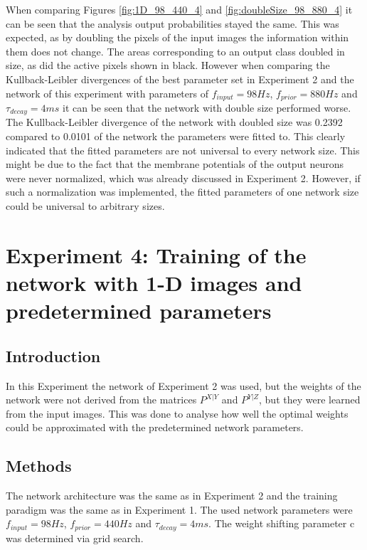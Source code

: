 When comparing Figures \ref{fig:1D_98_440_4} and \ref{fig:doubleSize_98_880_4} it can be seen that the analysis output probabilities stayed the same. This was expected, as by doubling the pixels of the input images the information within them does not change. The areas corresponding to an output class doubled in size, as did the active pixels shown in black. However when comparing the Kullback-Leibler divergences of the best parameter set in Experiment 2 and the network of this experiment with parameters of $f_{input} = 98 Hz$, $f_{prior} = 880 Hz$ and $\tau_{decay} = 4 ms$ it can be seen that the network with double size performed worse. The Kullback-Leibler divergence of the network with doubled size was 0.2392 compared to 0.0101 of the network the parameters were fitted to. This clearly indicated that the fitted parameters are not universal to every network size. This might be due to the fact that the membrane potentials of the output neurons were never normalized, which was already discussed in Experiment 2. However, if such a normalization was implemented, the fitted parameters of one network size could be universal to arbitrary sizes.

\section{Experiment 4: Training of the network with 1-D images and predetermined parameters}
\label{section:1DPreDetermined}

\subsection{Introduction}

In this Experiment the network of Experiment 2 was used, but the weights of the network were not derived from the matrices $P^{X|Y}$ and $P^{Y|Z}$, but they were learned from the input images. This was done to analyse how well the optimal weights could be approximated with the predetermined network parameters.

\subsection{Methods}

The network architecture was the same as in Experiment 2 and the training paradigm was the same as in Experiment 1. The used network parameters were $f_{input} = 98 Hz$, $f_{prior} = 440 Hz$ and $\tau_{decay} = 4 ms$. The weight shifting parameter c was determined via grid search.
